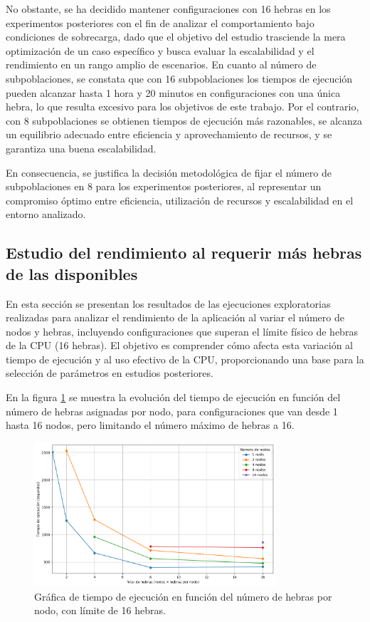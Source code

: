 No obstante, se ha decidido mantener configuraciones con 16 hebras en los experimentos posteriores con el fin de analizar el comportamiento bajo condiciones de sobrecarga, dado que el objetivo del estudio trasciende la mera optimización de un caso específico y busca evaluar la escalabilidad y el rendimiento en un rango amplio de escenarios. En cuanto al número de subpoblaciones, se constata que con 16 subpoblaciones los tiempos de ejecución pueden alcanzar hasta 1 hora y 20 minutos en configuraciones con una única hebra, lo que resulta excesivo para los objetivos de este trabajo. Por el contrario, con 8 subpoblaciones se obtienen tiempos de ejecución más razonables, se alcanza un equilibrio adecuado entre eficiencia y aprovechamiento de recursos, y se garantiza una buena escalabilidad.

En consecuencia, se justifica la decisión metodológica de fijar el número de subpoblaciones en 8 para los experimentos posteriores, al representar un compromiso óptimo entre eficiencia, utilización de recursos y escalabilidad en el entorno analizado.

\subsection{Estudio del rendimiento al requerir más hebras de las disponibles}

En esta sección se presentan los resultados de las ejecuciones exploratorias realizadas para analizar el rendimiento de la aplicación al variar el número de nodos y hebras, incluyendo configuraciones que superan el límite físico de hebras de la CPU (16 hebras). El objetivo es comprender cómo afecta esta variación al tiempo de ejecución y al uso efectivo de la CPU, proporcionando una base para la selección de parámetros en estudios posteriores.

En la figura \ref{fig:exploratory_threads_limit_time} se muestra la evolución del tiempo de ejecución en función del número de hebras asignadas por nodo, para configuraciones que van desde 1 hasta 16 nodos, pero limitando el número máximo de hebras a 16.

\begin{figure}[ht]
    \centering
    \includegraphics[width=0.8\textwidth]{imagenes/cap5/exploratory_threads_limit_time.png}
    \caption{Gráfica de tiempo de ejecución en función del número de hebras por nodo, con límite de 16 hebras.}
    \label{fig:exploratory_threads_limit_time}
\end{figure}

